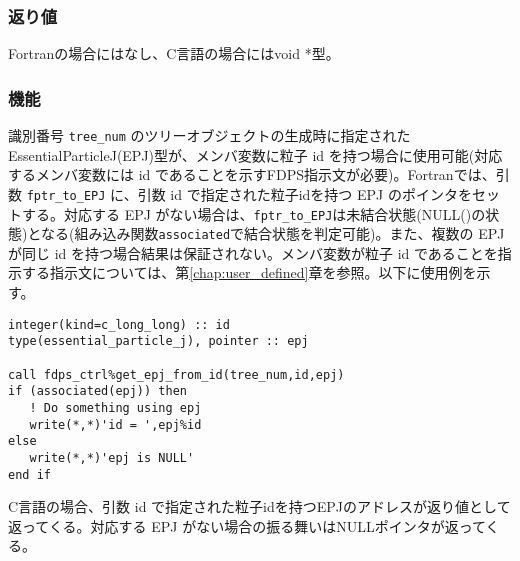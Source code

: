 \subsubsection*{返り値}
Fortranの場合にはなし、C言語の場合にはvoid *型。

\subsubsection*{機能}
識別番号 \texttt{tree\_num} のツリーオブジェクトの生成時に指定されたEssentialParticleJ(EPJ)型が、メンバ変数に粒子 id を持つ場合に使用可能(対応するメンバ変数には id であることを示すFDPS指示文が必要)。Fortranでは、引数 \texttt{fptr\_to\_EPJ} に、引数 id で指定された粒子idを持つ EPJ のポインタをセットする。対応する EPJ がない場合は、\texttt{fptr\_to\_EPJ}は未結合状態(NULL()の状態)となる(組み込み関数\texttt{associated}で結合状態を判定可能)。また、複数の EPJ が同じ id を持つ場合結果は保証されない。メンバ変数が粒子 id であることを指示する指示文については、第\ref{chap:user_defined}章を参照。以下に使用例を示す。
\begin{lstlisting}[caption=例]
integer(kind=c_long_long) :: id
type(essential_particle_j), pointer :: epj

call fdps_ctrl%get_epj_from_id(tree_num,id,epj)
if (associated(epj)) then
   ! Do something using epj
   write(*,*)'id = ',epj%id
else 
   write(*,*)'epj is NULL'
end if
\end{lstlisting}
C言語の場合、引数 id で指定された粒子idを持つEPJのアドレスが返り値として返ってくる。対応する EPJ がない場合の振る舞いはNULLポインタが返ってくる。
\clearpage

